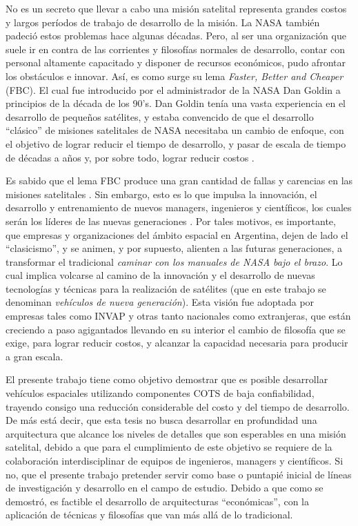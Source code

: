 No es un secreto que llevar a cabo una misión satelital representa grandes costos
y largos períodos de trabajo de desarrollo de la misión.
La NASA también padeció estos problemas hace algunas décadas.
Pero, al ser una organización que suele ir en contra de las corrientes y filosofías
normales de desarrollo, contar con personal altamente capacitado y disponer de recursos
económicos, pudo afrontar los obstáculos e innovar. Así, es como
surge su lema \textit{Faster, Better and Cheaper} (FBC).
El cual fue introducido por el administrador de la NASA Dan Goldin a
principios de la década de los 90's. Dan Goldin tenía una vasta experiencia en
el desarrollo de pequeños satélites, y estaba convencido de que el desarrollo
``clásico'' de misiones satelitales de NASA necesitaba un cambio de enfoque,
con el objetivo de lograr reducir el tiempo de desarrollo, y pasar de escala de tiempo de
décadas a años y, por sobre todo, lograr reducir costos \citep{Paxton07}.

Es sabido que el lema FBC produce una gran cantidad de fallas y
carencias en las misiones satelitales \citep{Paxton07}. Sin embargo,
esto es lo que impulsa la innovación, el desarrollo y entrenamiento de nuevos
managers, ingenieros y científicos, los cuales serán los líderes de las
nuevas generaciones \citep{Paxton07}. Por tales motivos, es importante,
que empresas y organizaciones del ámbito espacial en Argentina, dejen
de lado el ``clasicismo'', y se animen, y por supuesto, alienten a las futuras
generaciones, a transformar el tradicional \textit{caminar con los manuales de NASA bajo
  el brazo}. Lo cual implica volcarse al camino de la   innovación y el desarrollo
de nuevas tecnologías y técnicas para la realización de satélites (que en este trabajo se denominan
\textit{vehículos de nueva generación}). Esta visión fue adoptada por empresas tales como INVAP
y otras tanto nacionales como extranjeras,  que están creciendo a paso agigantados llevando
en su interior el cambio de filosofía que se exige, para lograr reducir costos, y 
alcanzar la capacidad necesaria para producir a gran escala.

El presente  trabajo tiene como objetivo demostrar que es posible desarrollar
vehículos espaciales utilizando componentes COTS de baja confiabilidad, trayendo
consigo una reducción considerable del costo y del tiempo de desarrollo. De más está
decir, que esta tesis no busca desarrollar en profundidad una arquitectura
que alcance los niveles de detalles que son esperables en una misión satelital, debido a que para
el cumplimiento de este objetivo se requiere de la colaboración interdisciplinar de equipos de 
ingenieros, managers y científicos. Si no, que el presente trabajo pretender servir como
base o puntapié inicial de líneas de investigación y desarrollo en el campo de estudio.
Debido a que como se demostró, es factible el desarrollo de arquitecturas
``económicas'', con la aplicación de técnicas y filosofías que van más allá de lo tradicional.

